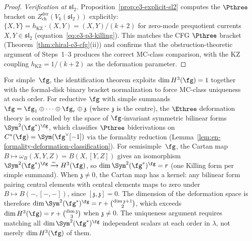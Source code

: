 \begin{proof}
\smallskip
\noindent\textit{Verification at $\mathfrak{sl}_2$.}
Proposition~\ref{prop:e3-explicit-sl2} computes the
$\Pthree$ bracket on
$Z^{\mathrm{der}}_{\mathrm{ch}}(V_k(\mathfrak{sl}_2))$
explicitly:
$\{X, Y\} = h_{\mathrm{KZ}} \cdot (X, Y)
= (X,Y)/(k + 2)$ for zero-mode prequotient currents
$X,Y\in\mathfrak{sl}_2$
(equation~\eqref{eq:e3-p3-killing}).
This matches the CFG $\Pthree$ bracket
(Theorem~\ref{thm:chiral-e3-cfg}(ii)) and confirms that
the obstruction-theoretic argument of Steps~1--3 produces the
correct MC-class comparison, with the KZ coupling
$h_{\mathrm{KZ}} = 1/(k+2)$ as the
deformation parameter.
\end{proof}

\begin{remark}
\label{rem:e3-non-simple}
For simple~$\fg$, the identification theorem exploits
$\dim H^3(\fg) = 1$ together with the formal-disk binary bracket
normalization to force MC-class uniqueness at each order.
For reductive $\fg$ with simple summands
$\fg = \fg_1 \oplus \cdots \oplus \fg_r \oplus \mathfrak{z}$
(where $\mathfrak{z}$ is the centre), the $\Ethree$
deformation theory is controlled by the space of
$\fg$-invariant symmetric bilinear forms
$\Sym^2(\fg^*)^\fg$, which classifies $\Pthree$
biderivations on $C^*(\fg) = \Sym(\fg^\vee[-1])$ via
the formality reduction
(Lemma~\ref{lem:en-formality-deformation-classification}).
For semisimple~$\fg$, the Cartan map
$B \mapsto \omega_B(X,Y,Z) = B(X,[Y,Z])$ gives an
isomorphism
$\Sym^2(\fg^*)^\fg \xrightarrow{\sim} H^3(\fg)$,
so $\dim \Sym^2(\fg^*)^\fg = r$ (one Killing form
per simple summand). When $\mathfrak{z} \neq 0$,
the Cartan map has a kernel: any bilinear form
pairing central elements with central elements maps
to zero under $B \mapsto B(-,[-,-])$, since
$[\mathfrak{z},\mathfrak{z}] = 0$. The dimension of the
deformation space is therefore
$\dim \Sym^2(\fg^*)^\fg
= r + \binom{\dim \mathfrak{z} + 1}{2}$,
which exceeds $\dim H^3(\fg)
= r + \binom{\dim\mathfrak{z}}{3}$
when $\mathfrak{z} \neq 0$.
The uniqueness argument requires matching all
$\dim \Sym^2(\fg^*)^\fg$ independent scalars at each
order in $\lambda$, not merely
$\dim H^3(\fg)$ of them.
\end{remark}

